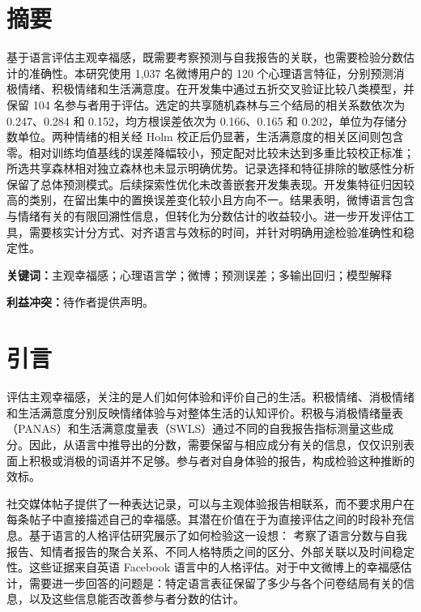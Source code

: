 

\section{摘要}
基于语言评估主观幸福感，既需要考察预测与自我报告的关联，也需要检验分数估计的准确性。本研究使用 1,037 名微博用户的 120 个心理语言特征，分别预测消极情绪、积极情绪和生活满意度。在开发集中通过五折交叉验证比较八类模型，并保留 104 名参与者用于评估。选定的共享随机森林与三个结局的相关系数依次为 0.247、0.284 和 0.152，均方根误差依次为 0.166、0.165 和 0.202，单位为存储分数单位。两种情绪的相关经 Holm 校正后仍显著，生活满意度的相关区间则包含零。相对训练均值基线的误差降幅较小，预定配对比较未达到多重比较校正标准；所选共享森林相对独立森林也未显示明确优势。记录选择和特征排除的敏感性分析保留了总体预测模式。后续探索性优化未改善嵌套开发集表现。开发集特征归因较高的类别，在留出集中的置换误差变化较小且方向不一。结果表明，微博语言包含与情绪有关的有限回溯性信息，但转化为分数估计的收益较小。进一步开发评估工具，需要核实计分方式、对齐语言与效标的时间，并针对明确用途检验准确性和稳定性。

\noindent\textbf{关键词：}主观幸福感；心理语言学；微博；预测误差；多输出回归；模型解释

\noindent\textbf{利益冲突：}待作者提供声明。

\section{引言}
评估主观幸福感，关注的是人们如何体验和评价自己的生活。积极情绪、消极情绪和生活满意度分别反映情绪体验与对整体生活的认知评价\citep{diener1984}。积极与消极情绪量表（PANAS）和生活满意度量表（SWLS）通过不同的自我报告指标测量这些成分\citep{diener1985,watson1988}。因此，从语言中推导出的分数，需要保留与相应成分有关的信息，仅仅识别表面上积极或消极的词语并不足够。参与者对自身体验的报告，构成检验这种推断的效标\citep{diener2018}。

社交媒体帖子提供了一种表达记录，可以与主观体验报告相联系，而不要求用户在每条帖子中直接描述自己的幸福感。其潜在价值在于为直接评估之间的时段补充信息。基于语言的人格评估研究展示了如何检验这一设想：\citet{park2015} 考察了语言分数与自我报告、知情者报告的聚合关系、不同人格特质之间的区分、外部关联以及时间稳定性。这些证据来自英语 Facebook 语言中的人格评估。对于中文微博上的幸福感估计，需要进一步回答的问题是：特定语言表征保留了多少与各个问卷结局有关的信息，以及这些信息能否改善参与者分数的估计。

